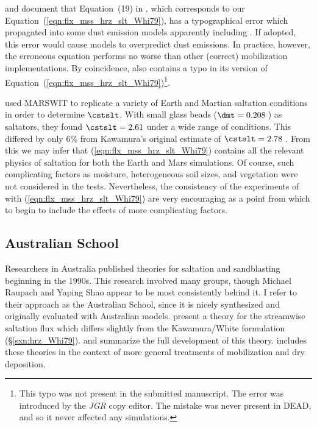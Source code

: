 \documentclass[12pt,twoside]{book}
\begin{document}
\cite{NaS97} and \cite{Baa05} document that Equation~(19) in
\cite{Whi79}, which corresponds to our
Equation~(\ref{eqn:flx_mss_hrz_slt_Whi79}), has a typographical error
which propagated into some dust emission models apparently including 
\cite{PaI02}.
If adopted, this error would cause models to overpredict dust emissions.
In practice, however, the erroneous equation performs no worse than
other (correct) mobilization implementations. 
By coincidence, \cite{ZBN03} also contains a typo in its version of 
Equation~(\ref{eqn:flx_mss_hrz_slt_Whi79})\footnote{
This typo was not present in the submitted manuscript.
The error was introduced by the \textit{JGR} copy editor.
The mistake was never present in DEAD, and so it never affected any 
simulations.}.  

\cite{Whi79} used MARSWIT to replicate a variety of Earth and Martian 
saltation conditions in order to determine $\cstslt$.
With small glass beads ($\dmt = 0.208$\,\mm) as saltators, they found
$\cstslt = 2.61$ under a wide range of conditions.
This differed by only 6\% from Kawamura's original estimate of
$\cstslt = 2.78$ \cite[][]{NaS97,Baa05}.
From this we may infer that (\ref{eqn:flx_mss_hrz_slt_Whi79}) contains 
all the relevant physics of saltation for both the Earth and Mars
simulations. 
Of course, such complicating factors as moisture, heterogeneous soil
sizes, and vegetation were not considered in the tests.
Nevertheless, the consistency of the experiments of \cite{Whi79} with
(\ref{eqn:flx_mss_hrz_slt_Whi79}) are very encouraging as a point from
which to begin to include the effects of more complicating factors.

\subsection[Australian School]{Australian School}\label{sxn:hrz_SRF93}
Researchers in Australia published theories for saltation and
sandblasting beginning in the 1990s. 
This research involved many groups, though Michael Raupach and Yaping
Shao appear to be most consistently behind it.
I refer to their approach as the Australian School, since it is nicely
synthesized and originally evaluated with Australian models.
\cite{SRF93} present a theory for the streamwise saltation flux which 
differs slightly from the Kawamura/White formulation
(\S\ref{sxn:hrz_Whi79}). 
\cite{LuS99} and \cite{Sha01} summarize the full development of this
theory. 
\cite{RaL04} includes these theories in the context of more general
treatments of mobilization and dry deposition. 
\end{document}
